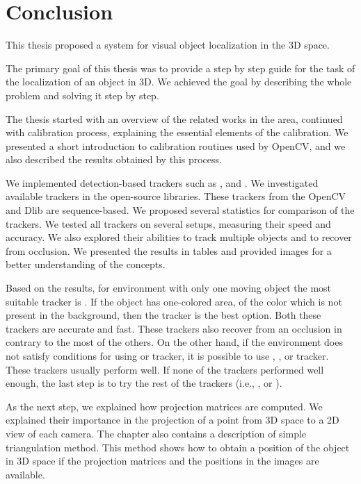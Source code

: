 \chapter*{Conclusion}

This thesis proposed a system for visual object localization in the 3D space.

The primary goal of this thesis was to provide a step by step guide for the task
of the localization of an object in 3D. We achieved the goal by describing
the whole problem and solving it step by step.

\bigskip

The thesis started with an overview of the related works in the area, continued
with calibration process, explaining the essential elements of the calibration.
We presented a short introduction to calibration routines used by OpenCV, and
we also described the results obtained by this process.

We implemented detection-based trackers such as \simback{}, \hsv{} and \patt{}.
We investigated available trackers in the open-source libraries. These trackers
from the OpenCV and Dlib are sequence-based. We proposed several statistics for
comparison of the trackers. We tested all trackers on several setups, measuring
their speed and accuracy. We also explored their abilities to track multiple
objects and to recover from occlusion. We presented the results in
tables and provided images for a better understanding of the concepts.

Based on the results, for environment with only one moving object the most
suitable tracker is \simback{}. If the object has one-colored area, of the color
which is not present in the background, then the \hsv{} tracker is the best
option. Both these trackers are accurate and fast. These trackers also recover
from an occlusion in contrary to the most of the others. On the other hand, if the
environment does not satisfy conditions for using \simback{} or \hsv{} tracker,
it is possible to use \medflow{}, \corr{}, \mosse{} or \tld{} tracker. These
trackers usually perform well. If none of the trackers performed well enough,
the last step is to try the rest of the trackers (i.e., \mil{}, \boost{} or
\patt{}).

\bigskip

As the next step, we explained how projection matrices are computed. We
explained their importance in the projection of a point from 3D space to a 2D
view of each camera. The chapter also contains a description of simple
triangulation method. This method shows how to obtain a position of the
object in 3D space if the projection matrices and the positions in the images
are available.

